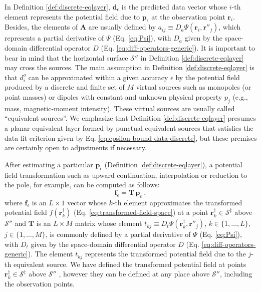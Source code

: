 In Definition \ref{def:discrete-eqlayer}, $\mathbf{d}_{\epsilon}$ is the predicted data vector 
whose $i$-th element represents the potential field due to $\mathbf{p}_{\epsilon}$ at the 
observation point $\mathbf{r}_{i}$. 
Besides, the elements of $\mathbf{A}$ are usually defined by 
$a_{ij} \equiv D_{a} \Psi(\mathbf{r}_{i}, \mathbf{r}''_{j})$, which represents a 
partial derivative of $\Psi$ (Eq. \ref{eq:Psi}), with $D_{a}$ given by the space-domain 
differential operator $D$ (Eq. \ref{eq:diff-operators-generic}). 
It is important to bear in mind that the horizontal surface $\mathcal{S}''$ in Definition 
\ref{def:discrete-eqlayer} may cross the sources.
The main assumption in Definition \ref{def:discrete-eqlayer} is that $d^{o}_{i}$ can be 
approximated within a given accuracy $\epsilon$ by the potential field produced by a discrete 
and finite set of $M$ virtual sources such as monopoles (or point masses) or dipoles with 
constant and unknown physical property $p_{j}$ (e.g., mass, magnetic-moment intensity). 
These virtual sources are usually called ``equivalent sources''.
We emphasize that Definition \ref{def:discrete-eqlayer} presumes a planar equivalent layer 
formed by punctual equivalent sources that satisfies the data fit criterion given by Eq. 
\ref{eq:epsilon-bound-data-discrete}, but these premises are certainly open to adjustments if 
necessary.

After estimating a particular $\mathbf{p}_{\epsilon}$ (Definition \ref{def:discrete-eqlayer}), 
a potential field transformation such as upward continuation, 
interpolation or reduction to the pole, for example, can be computed as follows:
\begin{equation}
	\mathbf{f}_{\epsilon} = \mathbf{T} \, \mathbf{p}_{\epsilon} \: ,
	\label{eq:transformed-field-discrete-layer} 
\end{equation}
where $\mathbf{f}_{\epsilon}$ is an $L \times 1$ vector whose $k$-th element approximates 
the transformed potential field $f(\mathbf{r}^{\ddagger}_{k})$ 
(Eq. \ref{eq:transformed-field-space}) 
at a point $\mathbf{r}^{\ddagger}_{k} \in \mathcal{S}^{\ddagger}$ above $\mathcal{S}''$ 
and $\mathbf{T}$ is an $L \times M$ matrix whose element 
$t_{kj} \equiv D_{t} \Psi(\mathbf{r}^{\ddagger}_{k}, \mathbf{r}''_{j})$,
$k \in \{ 1, \dots, L \}$, $j \in \{ 1, \dots, M \}$, 
is commonly defined by a partial derivative of $\Psi$ (Eq. \ref{eq:Psi}), with $D_{t}$ 
given by the space-domain differential operator $D$ (Eq. \ref{eq:diff-operators-generic}).
The element $t_{kj}$ represents the transformed potential field due to the $j$-th equivalent 
source. 
We have defined the transformed potential field at points 
$\mathbf{r}^{\ddagger}_{k} \in \mathcal{S}^{\ddagger}$ above $\mathcal{S}''$ , however they 
can be defined at any place above $\mathcal{S}''$, including the observation points. 

